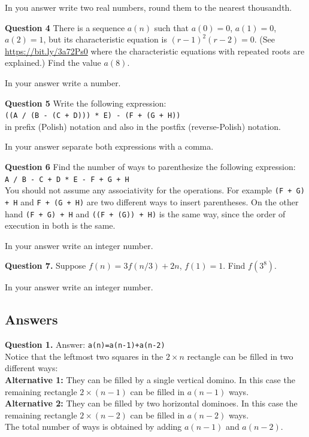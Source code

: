 \documentclass[jou]{apa6}
\begin{document}
In you answer write two real numbers, round them to the nearest thousandth.


\vspace{10pt}
{\bf Question 4}
There is a sequence $a(n)$ such that $a(0) = 0$, $a(1) = 0$, $a(2)=1$, but its
characteristic equation is $(r-1)^2(r-2) = 0$. (See \url{https://bit.ly/3a72Ps0} where
the characteristic equations with repeated roots are explained.)
Find the value $a(8)$.

In your answer write a number. 


\vspace{10pt}
{\bf Question 5} 
Write the following expression:\\
{\tt ((A / (B - (C + D))) * E) - (F + (G + H))}\\
in prefix (Polish) notation and also in the postfix (reverse-Polish) notation. 

In your answer separate both expressions with a comma.



\vspace{10pt}
{\bf Question 6} 
Find the number of ways to parenthesize the following expression:\\
{\tt A / B - C + D * E - F + G + H}\\
You should not assume any associativity for the operations.
For example {\tt (F + G) + H} and {\tt F + (G + H)} are two 
different ways to insert parentheses. On the other hand
{\tt (F + G) + H} and {\tt ((F + (G)) + H)} is the same way, since 
the order of execution in both is the same.

In your answer write an integer number.


\vspace{10pt}
{\bf Question 7.} 
Suppose $f(n) = 3f(n/3) + 2n$, $f(1) = 1$. Find $f(3^8)$.

In your answer write an integer number.





\newpage

\subsection{Answers}

\vspace{4pt}
{\bf Question 1.} Answer: {\tt a(n)=a(n-1)+a(n-2)}\\
Notice that the leftmost two squares in the $2 \times n$ 
rectangle can be filled in two different ways:\\
{\bf Alternative 1:} They can be filled by a single vertical domino. 
In this case the remaining rectangle $2 \times (n-1)$ can be 
filled in $a(n-1)$ ways.\\
{\bf Alternative 2:} They can be filled by two horizontal dominoes.
In this case the remaining rectangle $2 \times (n-2)$ can be filled
in $a(n-2)$ ways.\\
The total number of ways is obtained by adding $a(n-1)$ and $a(n-2)$.
\end{document}
